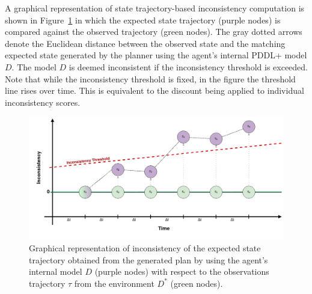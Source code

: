\documentclass[letterpaper]{article} %
\newcommand{\roni}[1]{{\textcolor{green}{[Roni: #1]}}}
\begin{document}
A graphical representation of state trajectory-based inconsistency computation is shown in Figure~\ref{fig:inconsistency_trajectory} in which the expected state trajectory (purple nodes) is compared against the observed trajectory (green nodes). The gray dotted arrows denote the Euclidean distance between the observed state and the matching expected state generated by the planner using the agent's internal PDDL+ model $D$. The model $D$ is deemed inconsistent if the inconsistency threshold is exceeded. Note that while the inconsistency threshold is fixed, in the figure the threshold line rises over time. This is equivalent to the discount being applied to individual inconsistency scores. 





\begin{figure}
	\centering
	\includegraphics[width=\columnwidth]{figures/trajectory_inconsistency2.png}
	\caption{Graphical representation of inconsistency of the expected state trajectory obtained from the generated plan by using the agent's internal model $D$ (purple nodes) with respect to the observations trajectory $\tau$ from the environment $D^*$ (green nodes).}
	\label{fig:inconsistency_trajectory}
\end{figure}
\end{document}
